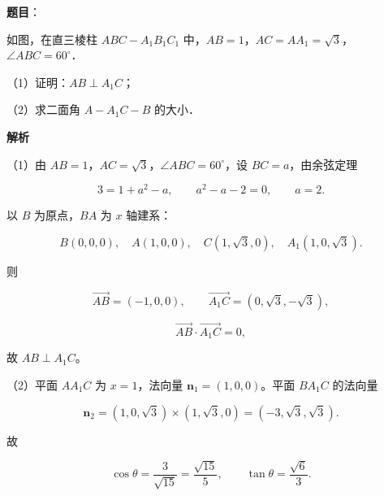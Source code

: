 \begin{answer}

\textbf{题目}：

如图，在直三棱柱 $ABC-A_1B_1C_1$ 中，$AB=1$，$AC=AA_1=\sqrt3$，$\angle ABC=60^\circ$．

（1）证明：$AB\perp A_1C$；

（2）求二面角 $A-A_1C-B$ 的大小．
\nopagebreak[4]
\begin{center}\end{center}
\nopagebreak[4]
\textbf{解析}

（1）由 $AB=1$，$AC=\sqrt3$，$\angle ABC=60^\circ$，设 $BC=a$，由余弦定理

\nopagebreak[4]
\[3=1+a^2-a,\qquad a^2-a-2=0,\qquad a=2.\]

以 $B$ 为原点，$BA$ 为 $x$ 轴建系：

\nopagebreak[4]
\[B(0,0,0),\quad A(1,0,0),\quad C(1,\sqrt3,0),\quad A_1(1,0,\sqrt3).\]

则

\nopagebreak[4]
\[\overrightarrow{AB}=(-1,0,0),\qquad \overrightarrow{A_1C}=(0,\sqrt3,-\sqrt3),\]

\nopagebreak[4]
\[\overrightarrow{AB}\cdot\overrightarrow{A_1C}=0,\]

故 $AB\perp A_1C$。

（2）平面 $AA_1C$ 为 $x=1$，法向量 $\boldsymbol n_1=(1,0,0)$。平面 $BA_1C$ 的法向量

\nopagebreak[4]
\[\boldsymbol n_2=(1,0,\sqrt3)\times(1,\sqrt3,0)=(-3,\sqrt3,\sqrt3).\]

故

\nopagebreak[4]
\[\cos\theta=\frac3{\sqrt{15}}=\frac{\sqrt{15}}5,\qquad
\tan\theta=\frac{\sqrt6}3.\]


\end{answer}
